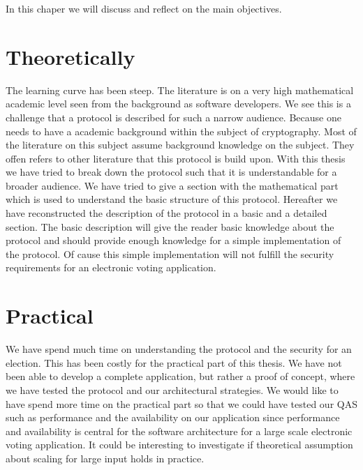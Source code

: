 In this chaper we will discuss and reflect on the main objectives.  



\section{Theoretically}

The learning curve has been steep. The literature is on a very high mathematical academic level  seen from the background as software developers. We see this is a challenge that a protocol is described for such a narrow audience. Because one needs to have a academic background within the subject of cryptography. Most of the literature on this subject assume background knowledge on the subject. They offen refers to other literature that this protocol is build upon. With this thesis we have tried to break down the protocol such that it is understandable for a broader audience. We have tried to give a section with the mathematical part which is used to understand the basic structure of this protocol. Hereafter we have reconstructed the description of the  protocol in a basic and a detailed section. The basic description will give the reader basic knowledge about the protocol and should provide enough knowledge for a simple implementation of the protocol. Of cause this simple implementation will not fulfill the security requirements for an electronic voting application.






\section{Practical}
We have spend much time on understanding the protocol and the security for an election. This has been costly for the practical part of this thesis. We have not been able to develop a complete application, but rather a proof of concept, where we have tested the protocol and our architectural strategies. We would like to have spend more time on the practical part so that we could have tested our QAS such as performance and the availability on our application since performance and availability is central for the software architecture for a large scale electronic voting application. It could be interesting to investigate if theoretical assumption about scaling for large input holds in practice. 



